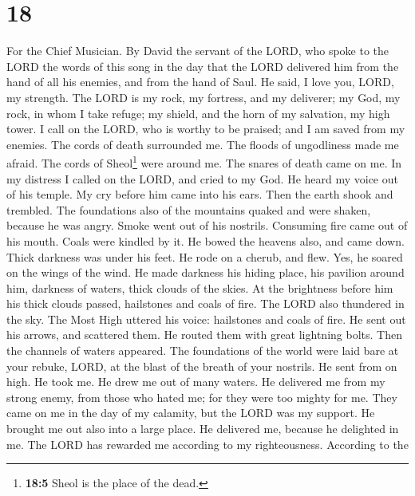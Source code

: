 \hypertarget{section-17}{%
\section{18}\label{section-17}}

For the Chief Musician. By David the servant of the LORD, who spoke to
the LORD the words of this song in the day that the LORD delivered him
from the hand of all his enemies, and from the hand of Saul. He said,
 I love you, LORD, my strength.  The LORD is
my rock, my fortress, and my deliverer; my God, my rock, in whom I take
refuge; my shield, and the horn of my salvation, my high tower.
 I call on the LORD, who is worthy to be praised; and I am
saved from my enemies.  The cords of death surrounded me.
The floods of ungodliness made me afraid.  The cords of
Sheol\footnote{\textbf{18:5} Sheol is the place of the dead.} were
around me. The snares of death came on me.  In my distress
I called on the LORD, and cried to my God. He heard my voice out of his
temple. My cry before him came into his ears.  Then the
earth shook and trembled. The foundations also of the mountains quaked
and were shaken, because he was angry.  Smoke went out of
his nostrils. Consuming fire came out of his mouth. Coals were kindled
by it.  He bowed the heavens also, and came down. Thick
darkness was under his feet.  He rode on a cherub, and
flew. Yes, he soared on the wings of the wind.  He made
darkness his hiding place, his pavilion around him, darkness of waters,
thick clouds of the skies.  At the brightness before him
his thick clouds passed, hailstones and coals of fire. 
The LORD also thundered in the sky. The Most High uttered his voice:
hailstones and coals of fire.  He sent out his arrows,
and scattered them. He routed them with great lightning bolts.
 Then the channels of waters appeared. The foundations of
the world were laid bare at your rebuke, LORD, at the blast of the
breath of your nostrils.  He sent from on high. He took
me. He drew me out of many waters.  He delivered me from
my strong enemy, from those who hated me; for they were too mighty for
me.  They came on me in the day of my calamity, but the
LORD was my support.  He brought me out also into a large
place. He delivered me, because he delighted in me.  The
LORD has rewarded me according to my righteousness. According to the
